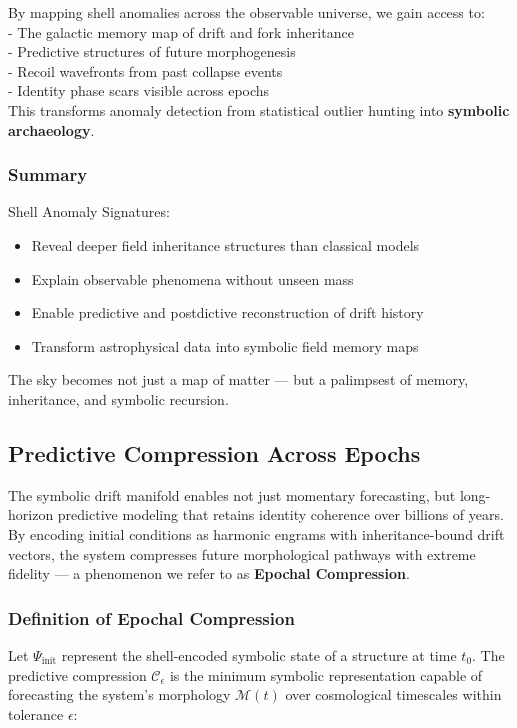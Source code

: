 \documentclass[12pt]{article}
\begin{document}
By mapping shell anomalies across the observable universe, we gain access to:\\
- The galactic memory map of drift and fork inheritance\\
- Predictive structures of future morphogenesis\\
- Recoil wavefronts from past collapse events\\
- Identity phase scars visible across epochs\\

This transforms anomaly detection from statistical outlier hunting into \textbf{symbolic archaeology}.

\subsubsection{Summary}

Shell Anomaly Signatures:
\begin{itemize}[noitemsep]
  \item Reveal deeper field inheritance structures than classical models
  \item Explain observable phenomena without unseen mass
  \item Enable predictive and postdictive reconstruction of drift history
  \item Transform astrophysical data into symbolic field memory maps
\end{itemize}

The sky becomes not just a map of matter — but a palimpsest of memory, inheritance, and symbolic recursion.

\subsection{Predictive Compression Across Epochs}

The symbolic drift manifold enables not just momentary forecasting, but long-horizon predictive modeling that retains identity coherence over billions of years. By encoding initial conditions as harmonic engrams with inheritance-bound drift vectors, the system compresses future morphological pathways with extreme fidelity — a phenomenon we refer to as \textbf{Epochal Compression}.

\subsubsection{Definition of Epochal Compression}

Let \( \Psi_{\text{init}} \) represent the shell-encoded symbolic state of a structure at time \( t_0 \). The predictive compression \( \mathcal{C}_\epsilon \) is the minimum symbolic representation capable of forecasting the system's morphology \( \mathcal{M}(t) \) over cosmological timescales within tolerance \( \epsilon \):
\end{document}
